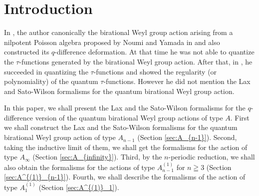 \documentclass[12pt,twoside]{article}
\theoremstyle{plain} %
\theoremstyle{definition} %
\theoremstyle{definition} %
\numberwithin{theorem}{section}
\numberwithin{equation}{section}
\numberwithin{figure}{section}
\numberwithin{table}{section}
\newcommand\secref[1]{Section \ref{#1}}
\begin{document}
\title{\TITLE}
\author{\AUTHOR}
\date{\DATE}
\maketitle
\begin{abstract}
  \ABSTRACT
\end{abstract}
\tableofcontents
\setcounter{section}{-1} %

\section{Introduction}

In \cite{Kuroki2008}, 
the author canonically  
the birational Weyl group action 
arising from a nilpotent Poisson algebra 
proposed by Noumi and Yamada in \cite{NY0012028}
and also constructed its $q$-difference deformation. 
At that time he was not able to quantize the $\tau$-functions 
generated by the birational Weyl group action.
After that, in \cite{Kuroki2012a}, he succeeded 
in quantizing the $\tau$-functions
and showed the regularity (or polynomiality) 
of the quantum $\tau$-functions.
However he did not mention the Lax and Sato-Wilson formalisms 
for the quantum birational Weyl group action.  

In this paper, we shall present the Lax and the Sato-Wilson formalisms
for the $q$-difference version of the quantum birational Weyl group actions
of type $A$.  
First we shall construct the Lax and the Sato-Wilson formalisms 
for the quantum birational Weyl group action of type $A_{n-1}$ 
(\secref{sec:A_{n-1}}).
Second, taking the inductive limit of them,
we shall get the formalisms for the action of type $A_\infty$
(\secref{sec:A_{infinity}}).  
Third, by the $n$-periodic reduction, we shall also obtain the formalisms 
for the actions of type $A^{(1)}_{n-1}$ for $n\geqq 3$
(\secref{sec:A^{(1)}_{n-1}}).
Fourth, we shall describe the formalisms of the action of type $A^{(1)}_1$
(\secref{sec:A^{(1)}_1}).

\end{document}
